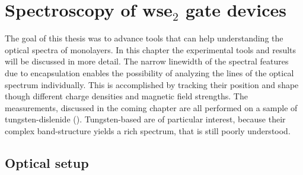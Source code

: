 \chapter{Spectroscopy of ws\textup{e}$_2$ gate devices}\label{spectroscopy}

The goal of this thesis was to advance tools that can help understanding the optical spectra of \tmdg monolayers. In this chapter the experimental tools and results will be discussed in more detail. The narrow linewidth of the spectral features due to \hbng encapsulation enables the possibility of analyzing the lines of the optical spectrum individually. This is accomplished by tracking their position and shape though different charge densities and magnetic field strengths. The measurements, discussed in the coming chapter are all performed on a sample of tungsten-dislenide (\wse\!). Tungsten-based \tmds are of particular interest, because their complex band-structure yields a rich spectrum, that is still poorly understood.

\section{Optical setup}

